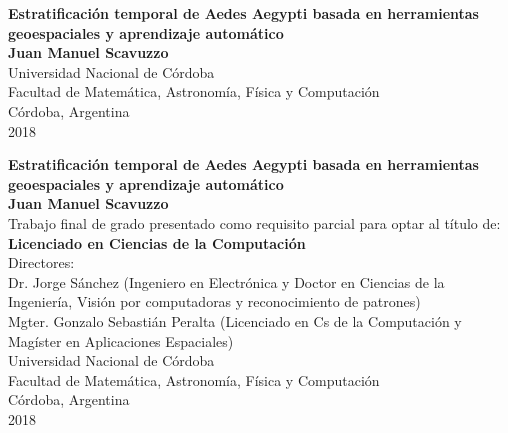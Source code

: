 \begin{center}
\begin{figure}
\centering%
%
\end{figure}
\thispagestyle{empty} \vspace*{0.1cm} \textbf{\huge
Estratificación temporal de Aedes Aegypti basada en herramientas geoespaciales y aprendizaje automático}\\[8.5cm]
\Large\textbf{Juan Manuel Scavuzzo}\\[0.5cm]
\small Universidad Nacional de Córdoba\\
Facultad de Matemática, Astronomía, Física y Computación\\
Córdoba, Argentina\\
2018\\
\end{center}

\newpage{\pagestyle{empty}\cleardoublepage}

\newpage
\begin{center}
\thispagestyle{empty} \vspace*{0cm} \textbf{\huge
Estratificación temporal de Aedes Aegypti basada en herramientas geoespaciales y aprendizaje automático}\\[6.0cm]
\Large\textbf{Juan Manuel Scavuzzo}\\[2.0cm]
\small Trabajo final de grado presentado como requisito parcial para optar al
título de:\\
\textbf{Licenciado en Ciencias de la Computación}\\[2.0cm]
Directores:\\

Dr. Jorge Sánchez (Ingeniero en Electrónica y Doctor en Ciencias de la Ingeniería, Visión por computadoras y reconocimiento de patrones)\\
Mgter. Gonzalo Sebastián Peralta (Licenciado en Cs de la Computación y Magíster en Aplicaciones Espaciales)\\ [2.0cm]

Universidad Nacional de Córdoba\\
Facultad de Matemática, Astronomía, Física y Computación\\
Córdoba, Argentina\\
2018\\\end{center}

\newpage{\pagestyle{empty}\cleardoublepage}

